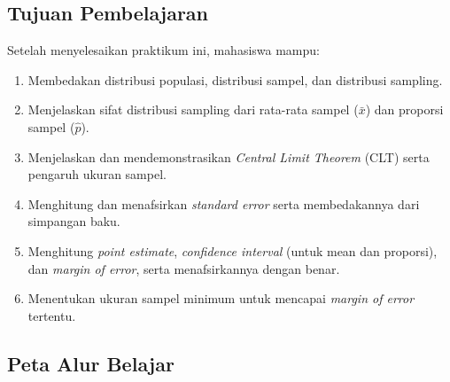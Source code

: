 \documentclass[
  indonesian,
  letterpaper,
]{book}
\providecommand{\tightlist}{%
  \setlength{\itemsep}{0pt}\setlength{\parskip}{0pt}}
\begin{document}
\subsection{Tujuan Pembelajaran}\label{tujuan-pembelajaran}

Setelah menyelesaikan praktikum ini, mahasiswa mampu:

\begin{enumerate}
\def\labelenumi{\arabic{enumi}.}
\tightlist
\item
  Membedakan distribusi populasi, distribusi sampel, dan distribusi
  sampling.
\item
  Menjelaskan sifat distribusi sampling dari rata-rata sampel
  (\(\bar{x}\)) dan proporsi sampel (\(\hat{p}\)).
\item
  Menjelaskan dan mendemonstrasikan \emph{Central Limit Theorem} (CLT)
  serta pengaruh ukuran sampel.
\item
  Menghitung dan menafsirkan \emph{standard error} serta membedakannya
  dari simpangan baku.
\item
  Menghitung \emph{point estimate}, \emph{confidence interval} (untuk
  mean dan proporsi), dan \emph{margin of error}, serta menafsirkannya
  dengan benar.
\item
  Menentukan ukuran sampel minimum untuk mencapai \emph{margin of error}
  tertentu.
\end{enumerate}

\subsection{Peta Alur Belajar}\label{peta-alur-belajar}
\end{document}
